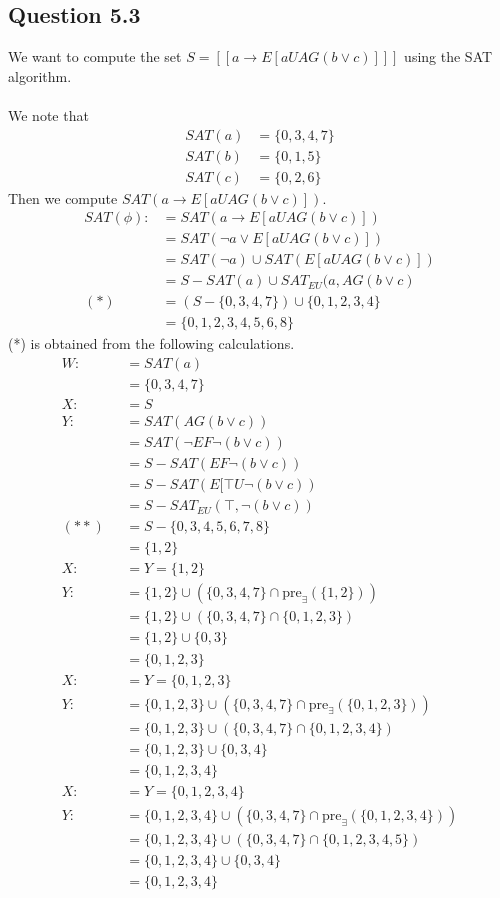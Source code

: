 \documentclass[12pt]{article}
\begin{document}
\subsection*{Question 5.3}
We want to compute the set $S=[[a\to E[aUAG(b\lor c)]]]$ using the SAT algorithm.\\
\\
We note that
\begin{align*}
SAT(a)&=\{0,3,4,7\} \\
SAT(b)&=\{0,1,5\} \\
SAT(c)&=\{0,2,6\}
\end{align*}
Then we compute $SAT(a\to E[aUAG(b\lor c)])$.
\begin{align*}
SAT(\phi):&=SAT(a\to E[aUAG(b\lor c)]) \\
&=SAT(\neg a\lor E[aUAG(b\lor c)]) \\
&=SAT(\neg a)\cup SAT(E[aUAG(b\lor c)]) \\
&=S-SAT(a)\cup SAT_{EU}(a,AG(b\lor c) \\
(*)\:\:\:&=(S-\{0,3,4,7\})\cup  \{0,1,2,3,4\} \\
&=\{0,1,2,3,4,5,6,8\}
\end{align*}
(*) is obtained from the following calculations.
\begin{align*}
W:&=SAT(a) \\
&=\{0,3,4,7\} \\
X:&=S \\
Y:&=SAT(AG(b\lor c)) \\
&=SAT(\neg EF\neg(b\lor c)) \\
&=S-SAT(EF\neg(b\lor c)) \\
&=S-SAT(E[\top U\neg(b\lor c)) \\
&=S-SAT_{EU}(\top,\neg(b\lor c)) \\
(**)\:\:\:&=S-\{0,3,4,5,6,7,8\} \\
&=\{1,2\} \\
X:&=Y=\{1,2\} \\
Y:&=\{1,2\} \cup (\{0,3,4,7\} \cap \mbox{pre}_{\exists}(\{1,2\})) \\
&=\{1,2\} \cup (\{0,3,4,7\} \cap \{0,1,2,3\}) \\
&=\{1,2\} \cup \{0,3\} \\
&=\{0,1,2,3\} \\
X:&=Y=\{0,1,2,3\} \\
Y:&=\{0,1,2,3\} \cup (\{0,3,4,7\} \cap \mbox{pre}_{\exists}(\{0,1,2,3\})) \\
&=\{0,1,2,3\} \cup (\{0,3,4,7\} \cap \{0,1,2,3,4\}) \\
&=\{0,1,2,3\} \cup \{0,3,4\} \\
&=\{0,1,2,3,4\} \\
X:&=Y=\{0,1,2,3,4\} \\
Y:&=\{0,1,2,3,4\} \cup (\{0,3,4,7\} \cap \mbox{pre}_{\exists}(\{0,1,2,3,4\})) \\
&=\{0,1,2,3,4\} \cup (\{0,3,4,7\} \cap \{0,1,2,3,4,5\}) \\
&=\{0,1,2,3,4\} \cup \{0,3,4\} \\
&=\{0,1,2,3,4\}
\end{align*}
\end{document}
